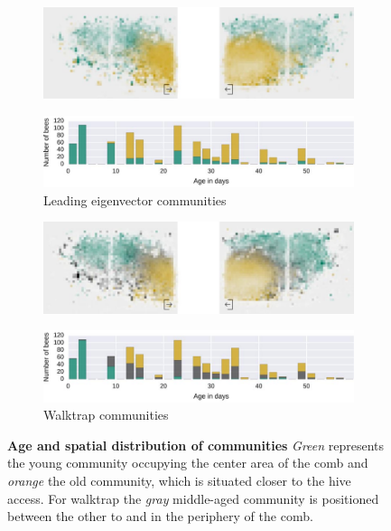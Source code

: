 \begin{figure}[!htb]
	\centering
	\begin{subfigure}[b]{1.0\textwidth}
	\centering
	\includegraphics[width=1.0\textwidth]{Figures/le_network3}
	\vspace{1pt}
	\end{subfigure} 
	\begin{subfigure}[b]{1.0\textwidth}
	\centering
	\includegraphics[width=1.0\textwidth]{Figures/n3-ageDistribution-LE}
	\caption[Leading eigenvector communities]{Leading eigenvector communities}
	\vspace{5mm}
	\label{fig:n3ageLE}
	\end{subfigure}
	\begin{subfigure}[b]{1.0\textwidth}
	\vspace{1pt}
	\centering
	\includegraphics[width=1.0\textwidth]{Figures/wt_network3}
	\vspace*{1pt}
	\end{subfigure}
	\begin{subfigure}[b]{1.0\textwidth}
	\centering
	\includegraphics[width=1.0\textwidth]{Figures/n3-ageDistribution-WT}
	\caption[Walktrap communities]{Walktrap communities}
	\label{fig:n3ageWT}
	\end{subfigure}
	\caption[Age and spatial distribution of communities]{\textbf{Age and spatial distribution of communities} \emph{Green} represents the young community occupying the center area of the comb and \emph{orange} the old community, which is situated closer to the hive access. For walktrap the \emph{gray} middle-aged community is positioned between the other to and in the periphery of the comb.}
	\label{fig:n3-communities}
\end{figure}